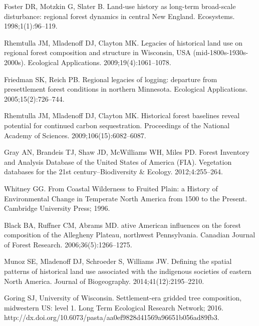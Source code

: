 \documentclass[10pt,letterpaper]{article}
\begin{document}
\begin{thebibliography}{10}
Foster DR, Motzkin G, Slater B.
\newblock Land-use history as long-term broad-scale disturbance: regional
  forest dynamics in central {N}ew {England}.
\newblock Ecosystems. 1998;1(1):96--119.

Rhemtulla JM, Mladenoff DJ, Clayton MK.
\newblock Legacies of historical land use on regional forest composition and
  structure in {W}isconsin, {USA} (mid-1800{s}-1930{s}-2000{s}).
\newblock Ecological Applications. 2009;19(4):1061--1078.

Friedman SK, Reich PB.
\newblock Regional legacies of logging: departure from presettlement forest
  conditions in northern {M}innesota.
\newblock Ecological Applications. 2005;15(2):726--744.

Rhemtulla JM, Mladenoff DJ, Clayton MK.
\newblock Historical forest baselines reveal potential for continued carbon
  sequestration.
\newblock Proceedings of the National Academy of Sciences.
  2009;106(15):6082--6087.

Gray AN, Brandeis TJ, Shaw JD, McWilliams WH, Miles PD.
\newblock Forest Inventory and Analysis Database of the {United States} of
  {America} ({FIA}).
\newblock Vegetation databases for the 21st century--Biodiversity \& Ecology.
  2012;4:255--264.

Whitney GG.
\newblock From Coastal Wilderness to Fruited Plain: a History of Environmental
  Change in Temperate {N}orth {A}merica from 1500 to the Present.
\newblock Cambridge University Press; 1996.

Black BA, Ruffner CM, Abrams MD.
ative {A}merican influences on the forest composition of the
  {A}llegheny {P}lateau, northwest {P}ennsylvania.
\newblock Canadian Journal of Forest Research. 2006;36(5):1266--1275.

Munoz SE, Mladenoff DJ, Schroeder S, Williams JW.
\newblock Defining the spatial patterns of historical land use associated with
  the indigenous societies of eastern {N}orth {A}merica.
\newblock Journal of Biogeography. 2014;41(12):2195--2210.

Goring SJ, {University of Wisconsin}.
\newblock Settlement-era gridded tree composition, midwestern {US}: level 1.
\newblock Long Term Ecological Research Network; 2016. http://dx.doi.org/10.6073/pasta/aa0ef9828d41569a96651b056ad89fb3.


\end{thebibliography}
\end{document}
